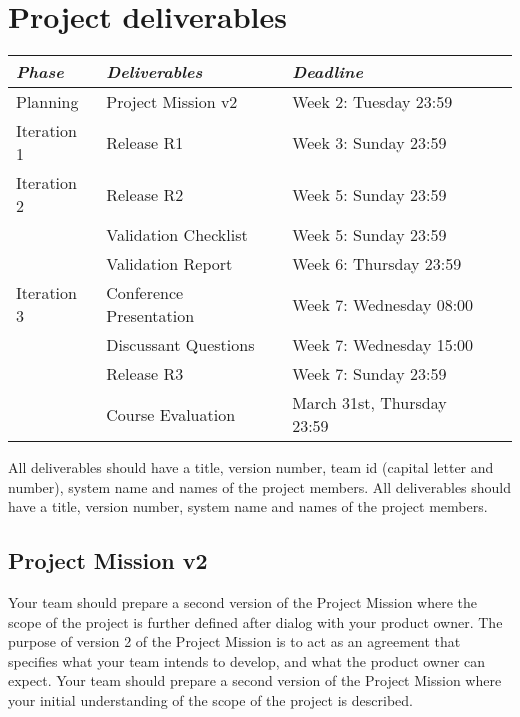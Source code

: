 \ifteknolog
\newcommand{\ITERATIONTHREE}{
 Iteration 3 & Conference Presentation & Week 7: Wednesday 08:00\\
      & Discussant Questions & Week 7: Wednesday 15:00\\
      & Release R3 & Week 7: Sunday 23:59\\
}
\else
\newcommand{\ITERATIONTHREE}{
    Iteration 3 & Release R3 & Week 7: Sunday 23:59\\
}
\fi

\section{Project deliverables}
\begin{tabular}{l |l p{5cm}  l}
{\it Phase} & {\it Deliverables} & {\it Deadline} \\
\hline
Planning & Project Mission v2& Week 2: Tuesday 23:59\\
Iteration 1 & Release R1 & Week 3: Sunday 23:59 \\
Iteration 2 & Release R2  & Week 5: Sunday 23:59\\
   & Validation Checklist & Week 5: Sunday 23:59\\
   & Validation Report & Week 6: Thursday 23:59\\
\ITERATIONTHREE
& Course Evaluation & March 31st, Thursday 23:59  \\

\end{tabular}
\vskip3mm

\ifteknolog
   \noindent All deliverables should have a title, version number, team id (capital letter and number), system name and names of the project members. 
\else
   \noindent All deliverables should have a title, version number, system name and names of the project members.
\fi

\subsection{Project Mission v2}
\ifteknolog
   Your team should prepare a second version of the Project Mission where the scope of the project is further defined after dialog with your product owner. The purpose of version 2 of the Project Mission is to act as an agreement that specifies what your team intends to develop, and what the product owner can expect.
\else
   Your team should prepare a second version of the Project Mission where your initial understanding of the scope of the project is described. 
\fi

